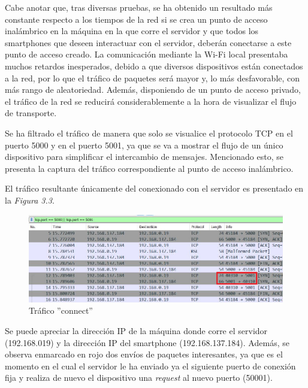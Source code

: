 \documentclass[a4paper,11pt]{book}
\begin{document}
			Cabe anotar que, tras diversas pruebas, se ha obtenido un resultado más constante respecto a los tiempos de la red si se crea un punto de acceso inalámbrico en la máquina en la que corre el servidor y que todos los smartphones que deseen interactuar con el servidor, deberán conectarse a este punto de acceso creado. La comunicación mediante la Wi-Fi local presentaba muchos retardos inesperados, debido a que diversos dispositivos están conectados a la red, por lo que el tráfico de paquetes será mayor y, lo más desfavorable, con más rango de aleatoriedad.
			Además, disponiendo de un punto de acceso privado, el tráfico de la red se reducirá considerablemente a la hora de visualizar el flujo de transporte.
			
			Se ha filtrado el tráfico de manera que solo se visualice el protocolo TCP en el puerto 5000 y en el puerto 5001, ya que se va a mostrar el flujo de un único dispositivo  para simplificar el intercambio de mensajes. Mencionado esto, se presenta la captura del tráfico correspondiente al punto de acceso inalámbrico. 
			
			El tráfico resultante únicamente del conexionado con el servidor es presentado en la \textit{Figura 3.3}.
			
\begin{figure}[hbtp]
\centering
\includegraphics[width = 15cm]{FIGURAS/trafico_connect.png}
\caption{Tráfico ''connect''}
\end{figure}

Se puede apreciar la dirección IP de la máquina donde corre el servidor (192.168.019) y la dirección IP del smartphone (192.168.137.184). Además, se observa enmarcado en rojo dos envíos de paquetes interesantes, ya que es el momento en el cual el servidor le ha enviado ya el siguiente puerto de conexión fija y realiza de nuevo el dispositivo una \textit{request} al nuevo puerto (50001).
\end{document}
